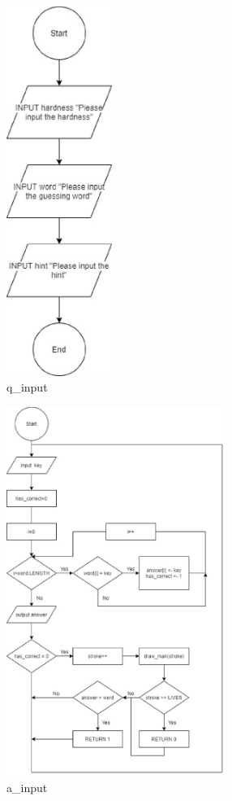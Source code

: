 \documentclass{article}
\begin{document}
        \begin{figure}[htbp]
            \centering
            \includegraphics[height = 12cm]{flowchart/q_input.eps}
            \caption{q\_input}
        \end{figure}

        \begin{figure}[htbp]
            \centering
            \includegraphics[height = 12cm]{flowchart/a_input.eps}
            \caption{a\_input}
        \end{figure}
\end{document}
